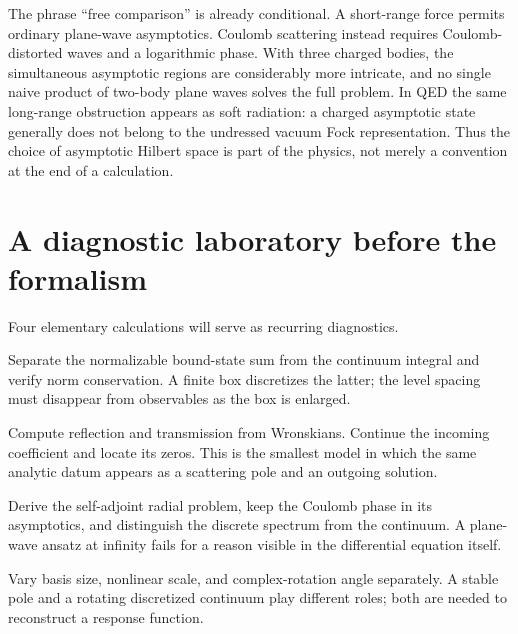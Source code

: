 The phrase ``free comparison'' is already conditional.  A short-range force
permits ordinary plane-wave asymptotics.  Coulomb scattering instead requires
Coulomb-distorted waves and a logarithmic phase.  With three charged bodies,
the simultaneous asymptotic regions are considerably more intricate, and no
single naive product of two-body plane waves solves the full problem.  In QED
the same long-range obstruction appears as soft radiation: a charged
asymptotic state generally does not belong to the undressed vacuum Fock
representation.  Thus the choice of asymptotic Hilbert space is part of the
physics, not merely a convention at the end of a calculation.

\section*{A diagnostic laboratory before the formalism}
{}

Four elementary calculations will serve as recurring diagnostics.

\begin{description}[style=nextline]
  \item[A packet in a square well.]
  Separate the normalizable bound-state sum from the continuum integral and
  verify norm conservation.  A finite box discretizes the latter; the level
  spacing must disappear from observables as the box is enlarged.

  \item[A packet crossing a finite barrier.]
  Compute reflection and transmission from Wronskians.  Continue the incoming
  coefficient and locate its zeros.  This is the smallest model in which the
  same analytic datum appears as a scattering pole and an outgoing solution.

  \item[Hydrogenic motion.]
  Derive the self-adjoint radial problem, keep the Coulomb phase in its
  asymptotics, and distinguish the discrete spectrum from the continuum.  A
  plane-wave ansatz at infinity fails for a reason visible in the differential
  equation itself.

  \item[A finite-basis resonance calculation.]
  Vary basis size, nonlinear scale, and complex-rotation angle separately.
  A stable pole and a rotating discretized continuum play different roles;
  both are needed to reconstruct a response function.
\end{description}

